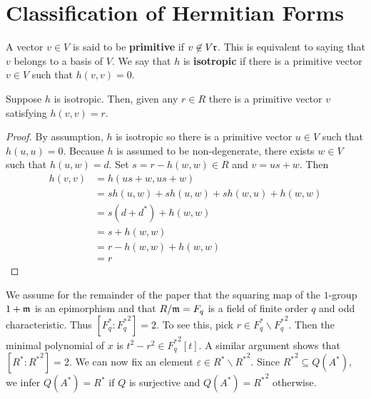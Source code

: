 
\section{Classification of Hermitian Forms}
A vector $v \in V$ is said to be \textbf{primitive} if $v \not\in V \mathfrak{r}$.
This is equivalent to saying that $v$ belongs to a basis of $V$.
We say that $h$ is \textbf{isotropic} if there is a primitive vector $v \in V$ such that $h(v,v) = 0$.

\begin{lemma}\label{lemma3.1}
Suppose $h$ is isotropic. Then, given any $r \in R$ there is a primitive vector $v$ satisfying $h(v,v) = r$.
\end{lemma}

\begin{proof}
By assumption, $h$ is isotropic so there is a primitive vector $u \in V$ such that $h(u,u) = 0$.
Because $h$ is assumed to be non-degenerate, there exists $w \in V$ such that $h(u,w) = d$.
Set $s = r - h(w,w) \in R$ and $v = us + w$.
Then
\begin{align*}
h(v,v) &= h(us + w, us + w) \\
&= sh(u,w) + sh(u,w) + sh(w,u) + h(w,w) \\
&= s(d + d^*) + h(w,w) \\
&= s + h(w,w)\\
&= r - h(w,w) + h(w,w)\\
&= r
\end{align*}
\end{proof}

We assume for the remainder of the paper that the squaring map of the $1$-group $1 + \mathfrak{m}$ is an epimorphism and that $R/\mathfrak{m} = F_q$
is a field of finite order $q$ and odd characteristic.
Thus $[F_q^* : {F_q^*}^2] = 2$. To see this, pick $r \in F_q^* \backslash {F_q^*}^2$.
Then the minimal polynomial of $x$ is $t^2 - r^2 \in {F_q^*}^2[t]$.
A similar argument shows that $[R^* : {R^*}^2] = 2$.
We can now fix an element $\varepsilon \in R^* \backslash {R^*}^2$.
Since ${R^*}^2 \subseteq Q(A^*)$, we infer $Q(A^*) = R^*$ if $Q$ is surjective and $Q(A^*) = {R^*}^2$ otherwise.

